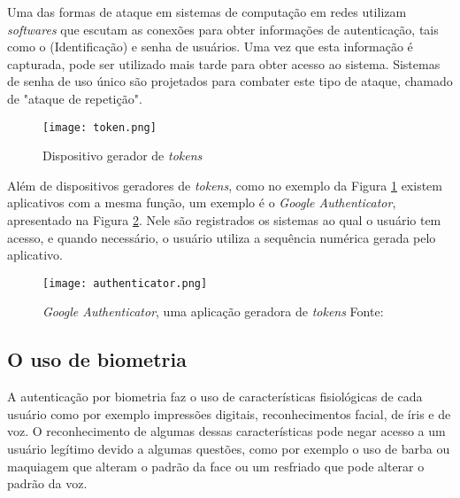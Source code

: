 \begin{citacao}
Uma das formas de ataque em sistemas de computação em redes utilizam \textit{softwares} que escutam as conexões para obter informações de autenticação, tais como o  (Identificação) e senha de usuários. Uma vez que esta informação é capturada, pode ser utilizado mais tarde para obter acesso ao sistema. Sistemas de senha de uso único são projetados para combater este tipo de ataque, chamado de "ataque de repetição".\cite{rfc2289}
\end{citacao}

\vspace{-3mm}
\begin{figure}[!htb]
	\centering
	\texttt{[image: token.png]}
	\vspace{-5mm}
	\footnotesize
	\caption[Dispositivo gerador de \textit{tokens}]{Dispositivo gerador de \textit{tokens}}
	\label{fig:token}
\end{figure}

Além de dispositivos geradores de \textit{tokens}, como no exemplo da Figura \ref{fig:token} existem aplicativos com a mesma função, um exemplo é o \textit{Google Authenticator}, apresentado na Figura \ref{fig:tokenapp}. Nele são registrados os sistemas ao qual o usuário tem acesso, e quando necessário, o usuário utiliza a sequência numérica gerada pelo aplicativo.

\vspace{-3mm}
\begin{figure}[!htb]
	\centering
	\texttt{[image: authenticator.png]}
	\vspace{-2mm}
	\caption[\textit{Google Authenticator}, uma aplicação geradora de \textit{tokens}]{\textit{Google Authenticator}, uma aplicação geradora de \textit{tokens} Fonte: \cite{authenticator}}
	\label{fig:tokenapp}
\end{figure}

\subsection{O uso de biometria}
A autenticação por biometria faz o uso de características fisiológicas de cada usuário como por exemplo impressões digitais, reconhecimentos facial, de íris e de voz.
O reconhecimento de algumas dessas características pode negar acesso a um usuário legítimo devido a algumas questões, como por exemplo o uso de barba ou maquiagem que alteram o padrão da face ou um resfriado que pode alterar o padrão da voz.

